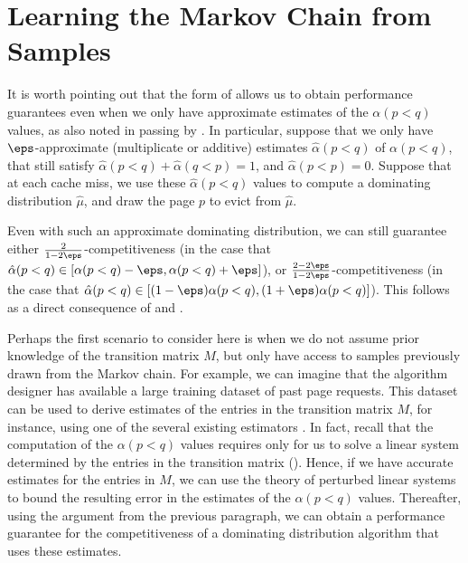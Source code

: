 \section{Learning the Markov Chain from Samples}
\label{sec:robustness}

It is worth pointing out that the form of  allows us to obtain performance guarantees even when we only have approximate estimates of the $\alpha(p<q)$ values, as also noted in passing by \cite{lund1999paging}. In particular, suppose that we only have $\eps$-approximate (multiplicate or additive) estimates $\hat{\alpha}(p<q)$ of $\alpha(p<q)$, that still satisfy $\hat{\alpha}(p<q) + \hat{\alpha}(q<p)=1$, and $\hat{\alpha}(p<p)=0$. Suppose that at each cache miss, we use these $\hat{\alpha}(p<q)$ values to compute a dominating distribution $\hat{\mu}$, and draw the page $p$ to evict from $\hat{\mu}$.

Even with such an approximate dominating distribution, we can still guarantee either $\frac{2}{1-2\eps}$-competitiveness (in the case that $\hat{\alpha}(p<q) \in [\alpha(p<q)-\eps, \alpha(p<q)+\eps]$), or $\frac{2-2\eps}{1-2\eps}$-competitiveness (in the case that $\hat{\alpha}(p<q) \in [(1-\eps)\alpha(p<q), (1+\eps)\alpha(p<q)]$). This follows as a direct consequence of  and .

Perhaps the first scenario to consider here is when we do not assume prior knowledge of the transition matrix $M$, but only have access to samples previously drawn from the Markov chain. For example, we can imagine that the algorithm designer has available a large training dataset of past page requests. This dataset can be used to derive estimates of the entries in the transition matrix $M$, for instance, using one of the several existing estimators \citep{hao2018learning, wolfer2021statistical, huang2024non}. In fact, recall that the computation of the $\alpha(p<q)$ values requires only for us to solve a linear system determined by the entries in the transition matrix (). Hence, if we have accurate estimates for the entries in $M$, we can use the theory of perturbed linear systems to bound the resulting error in the estimates of the $\alpha(p<q)$ values. Thereafter, using the argument from the previous paragraph, we can obtain a performance guarantee for the competitiveness of a dominating distribution algorithm that uses these estimates.

